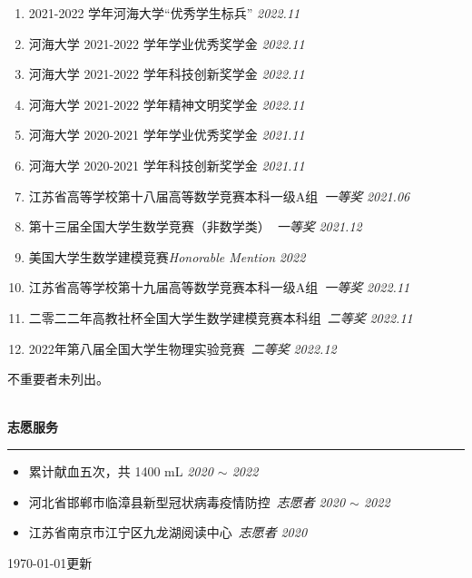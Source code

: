 \documentclass[12pt]{article}
\newcommand{\sect}[1]{
    ~\\ \noindent \textbf{#1} \medskip \hrule \medskip
}
\begin{document}
\begin{enumerate}
    \item 2021-2022 学年河海大学“优秀学生标兵” \hfill \textit{2022.11}
    \item 河海大学 2021-2022 学年学业优秀奖学金 \hfill \textit{2022.11}
    \item 河海大学 2021-2022 学年科技创新奖学金 \hfill \textit{2022.11}
    \item 河海大学 2021-2022 学年精神文明奖学金 \hfill \textit{2022.11}
    \item 河海大学 2020-2021 学年学业优秀奖学金 \hfill \textit{2021.11}
    \item 河海大学 2020-2021 学年科技创新奖学金 \hfill \textit{2021.11}
          \\
    \item 江苏省高等学校第十八届高等数学竞赛本科一级A组\ \textit{一等奖} \hfill \textit{2021.06}
    \item 第十三届全国大学生数学竞赛（非数学类）\ \textit{一等奖} \hfill \textit{2021.12}
    \item 美国大学生数学建模竞赛\textit{Honorable Mention} \hfill \textit{2022}
    \item 江苏省高等学校第十九届高等数学竞赛本科一级A组\ \textit{一等奖} \hfill \textit{2022.11}
    \item 二零二二年高教社杯全国大学生数学建模竞赛本科组\ \textit{二等奖} \hfill \textit{2022.11}
    \item 2022年第八届全国大学生物理实验竞赛\ \textit{二等奖}  \hfill \textit{2022.12}
\end{enumerate}

\hfill {\tiny 不重要者未列出。}


\sect{志愿服务}

\begin{itemize}[noitemsep,nolistsep]
    \item 累计献血五次，共 1400 mL \hfill \textit{2020 $\sim$ 2022}
    \item 河北省邯郸市临漳县新型冠状病毒疫情防控\ \textit{志愿者} \hfill \textit{2020 $\sim$ 2022}
    \item 江苏省南京市江宁区九龙湖阅读中心\ \textit{志愿者} \hfill \textit{2020}
\end{itemize}

\hfill {\tiny \today 更新}
\end{document}
